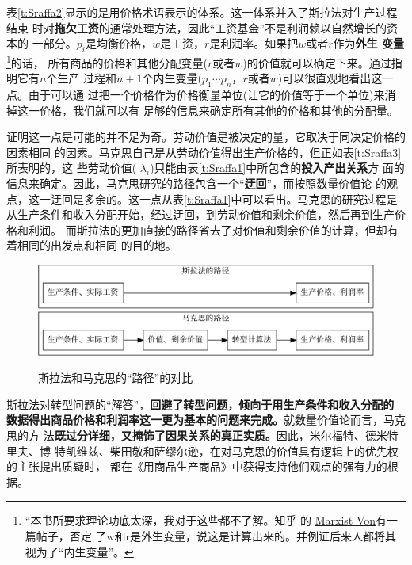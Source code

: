 表\ref{t:Sraffa2}显示的是用价格术语表示的体系。这一体系并入了斯拉法对生产过程结束
时对\textbf{拖欠工资}的通常处理方法，因此“工资基金”不是利润赖以自然增长的资本的
一部分。$p_i$是均衡价格，$w$是工资，$r$是利润率。如果把$w$或者$r$作为\textbf{外生
  变量}\footnote{“本书所要求理论功底太深，我对于这些都不了解。知乎
  的 \href{https://www.zhihu.com/question/52216261}{Marxist Von}有一篇帖子，否定
  了w和r是外生变量，说这是计算出来的。并例证后来人都将其视为了“内生变量”。}的话，
所有商品的价格和其他分配变量($r或者w$)的价值就可以确定下来。通过指明它有$n$个生产
过程和$n+1$个内生变量($p_1 \cdots p_n，r或者w$)可以很直观地看出这一点。由于可以通
过把一个价格作为价格衡量单位(让它的价值等于一个单位)来消掉这一价格，我们就可以有
足够的信息来确定所有其他的价格和其他的分配量。


证明这一点是可能的并不足为奇。劳动价值是被决定的量，它取决于同决定价格的因素相同
的因素。马克思自己是从劳动价值得出生产价格的，但正如表\ref{t:Sraffa3}所表明的，这
些劳动价值( $\lambda _i$)只能由表\ref{t:Sraffa1}中所包含的\textbf{投入产出关系}方
面的信息来确定。因此，马克思研究的路径包含一个“\textbf{迂回}”，而按照数量价值论
的观点，这一迂回是多余的。这一点从表\ref{t:Sraffa1}中可以看出。马克思的研究过程是
从生产条件和收入分配开始，经过迂回，到劳动价值和剩余价值，然后再到生产价格和利润。
而斯拉法的更加直接的路径省去了对价值和剩余价值的计算，但却有着相同的出发点和相同
的目的地。

\begin{figure}[htbp]
\centering
\caption{斯拉法和马克思的“路径”的对比}
\includegraphics[width=0.8\linewidth]{data/marx1929-1990/sraffa1} 
\label{fig:sraffa1}
\end{figure}

斯拉法对转型问题的“解答”，\textbf{回避了转型问题，倾向于用生产条件和收入分配的
  数据得出商品价格和利润率这一更为基本的问题来完成。}就数量价值论而言，马克思的方
法\textbf{既过分详细，又掩饰了因果关系的真正实质。}因此，米尔福特、德米特里夫、博
特凯维兹、柴田敬和萨缪尔逊，在对马克思的价值具有逻辑上的优先权的主张提出质疑时，
都在《用商品生产商品》中获得支持他们观点的强有力的根据。

